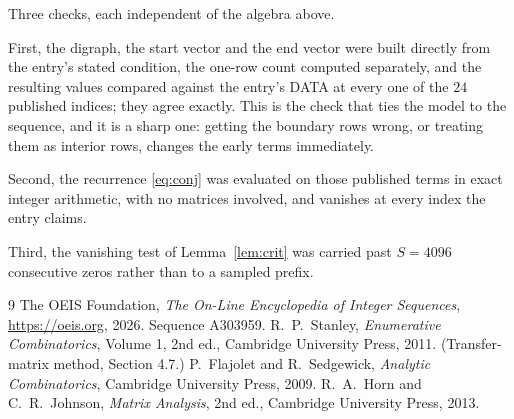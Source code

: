 \documentclass[11pt,a4paper]{article}
\theoremstyle{plain}
\theoremstyle{definition}
\begin{document}
Three checks, each independent of the algebra above.

First, the digraph, the start vector and the end vector were built directly from the
entry's stated condition, the one-row count computed separately, and the resulting values
compared against the entry's DATA at every one of the $24$ published indices; they
agree exactly. This is the check that ties the model to the sequence, and it is a sharp one:
getting the boundary rows wrong, or treating them as interior rows, changes the early terms
immediately.

Second, the recurrence \eqref{eq:conj} was evaluated on those published terms in exact
integer arithmetic, with no matrices involved, and vanishes at every index the entry claims.

Third, the vanishing test of Lemma~\ref{lem:crit} was carried past $S=4096$ consecutive
zeros rather than to a sampled prefix.

\begin{thebibliography}{9}
 The OEIS Foundation, \emph{The On-Line Encyclopedia of Integer
Sequences}, \url{https://oeis.org}, 2026. Sequence A303959.
 R.~P.~Stanley, \emph{Enumerative Combinatorics}, Volume 1, 2nd ed.,
Cambridge University Press, 2011. (Transfer-matrix method, Section 4.7.)
 P.~Flajolet and R.~Sedgewick, \emph{Analytic Combinatorics}, Cambridge
University Press, 2009.
 R.~A.~Horn and C.~R.~Johnson, \emph{Matrix Analysis}, 2nd ed., Cambridge
University Press, 2013.
\end{thebibliography}
\end{document}
